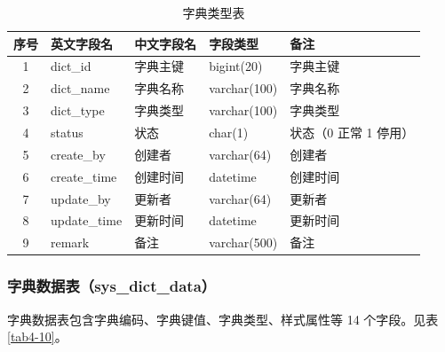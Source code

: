 \documentclass{izdthesis}
\begin{document}
\begin{table}[H]
  \centering
  \caption{字典类型表}
  \label{tab4-9}
  \songti
  \begin{tabular}{c l l l p{4cm}}
    \toprule
    序号 & 英文字段名 & 中文字段名 & 字段类型 & 备注 \\
    \midrule
    1 & dict\_id & 字典主键 & bigint(20) & 字典主键 \\
    2 & dict\_name & 字典名称 & varchar(100) & 字典名称 \\
    3 & dict\_type & 字典类型 & varchar(100) & 字典类型 \\
    4 & status & 状态 & char(1) & 状态（0 正常 1 停用） \\
    5 & create\_by & 创建者 & varchar(64) & 创建者 \\
    6 & create\_time & 创建时间 & datetime & 创建时间 \\
    7 & update\_by & 更新者 & varchar(64) & 更新者 \\
    8 & update\_time & 更新时间 & datetime & 更新时间 \\
    9 & remark & 备注 & varchar(500) & 备注 \\
    \bottomrule
  \end{tabular}
\end{table}

\subsubsection{字典数据表（sys\_dict\_data）}
字典数据表包含字典编码、字典键值、字典类型、样式属性等 14 个字段。见表 \ref{tab4-10}。
\end{document}
